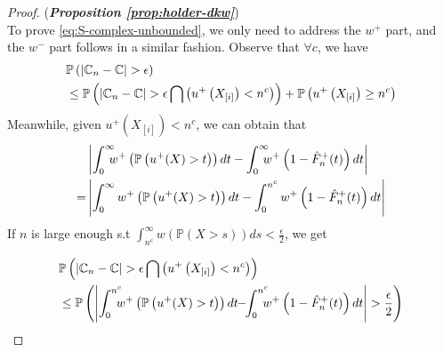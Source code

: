 \begin{proof}(\textbf{\textit{Proposition \ref{prop:holder-dkw}}})\ \\
To prove \eqref{eq:S-complex-unbounded}, we only need to 
address the $w^+$ part, and the $w^-$ part follows in a similar fashion.
Observe that $\forall c$, we have 
\begin{align*}
&\mathbb{P}\left(\left|\mathbb{C}_n -\mathbb{C} \right| > \epsilon \right) \nonumber\\
&\leq \mathbb{P}\left(\left|\mathbb{C}_n -\mathbb{C} \right| > \epsilon \bigcap \left(u^+\left(X_{[i]}\right) < n^c\right)\right)
+ \mathbb{P}\left(u^+\left(X_{[i]}\right) \geq n^c \right)
\end{align*}
Meanwhile, given $u^+\left(X_{[i]}\right) < n^c$, we can obtain that 
\begin{align*}
&\left|\int_0^{\infty}\!\!\!\! w^+\left(\Prob{u^+(X)>t}\right) dt- \int_0^{\infty} \!\!\!\! w^+\left(1- {\hat F^+_n}(t)\right) dt\right| \\ = &
    \left|\int_0^{\infty} w^+\left(\Prob{u^+(X)>t}\right) dt- \int_0^{n^c} w^+\left(1- {\hat F^+_n}(t)\right) dt\right|
\end{align*}
If $n$ is large enough s.t
$\int_{n^c}^\infty\!\!w\left(\mathbb{P} \left( X > s \right)\right) ds < \frac{\epsilon}{2}$, we get 

\begin{align*}
&\mathbb{P}\left(\left|\C_n -\C \right| > \epsilon \bigcap \left(u^+\left(X_{[i]}\right) < n^c\right)\right)\\ 
&\leq \mathbb{P}\left(\left|\int_0^{n^c}\!\!\!\! w^+ \left(\Prob{u^+(X)>t}\right)dt \!\!-\!\! 
\int_0^{n^c}\!\!\!\!w^+\left(1- {\hat F^+_n}(t)\right) dt\right| > \frac{\epsilon}{2}\right)
\end{align*}


\end{proof}
